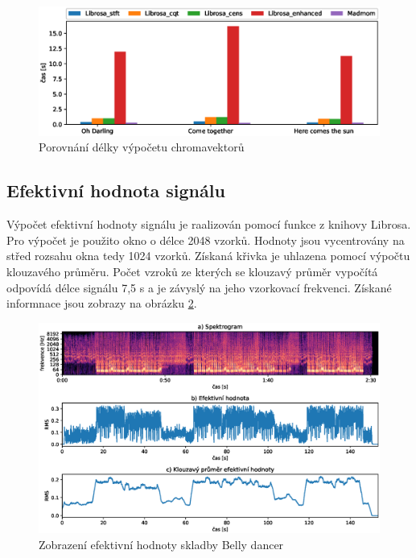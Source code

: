 \begin{figure}[H]
    \centering
    \includegraphics[width = 1\linewidth]{obrazky/Chroma_analysis_times_comparison.eps}
    \caption{Porovnání délky výpočetu chromavektorů}
    \label{fig:Chroma_calculation_time}
\end{figure}

    
\subsection{Efektivní hodnota signálu}

Výpočet efektivní hodnoty signálu je raalizován pomocí funkce z knihovy Librosa. Pro výpočet je použito okno o délce 2048 vzorků. Hodnoty jsou vycentrovány na střed rozsahu okna tedy 1024 vzorků. Získaná křivka je uhlazena pomocí výpočtu klouzavého průměru. Počet vzroků ze kterých se klouzavý průměr vypočítá odpovídá délce signálu 7,5 s a je závyslý na jeho vzorkovací frekvenci. Získané informnace jsou zobrazy na obrázku \ref{fig:RMS_calculation}.

\begin{figure}[H]
    \centering
    \includegraphics[width = 1\linewidth]{obrazky/Belly_dancer_RMS.eps}
    \caption{Zobrazení efektivní hodnoty skladby Belly dancer}
    \label{fig:RMS_calculation}
\end{figure}


